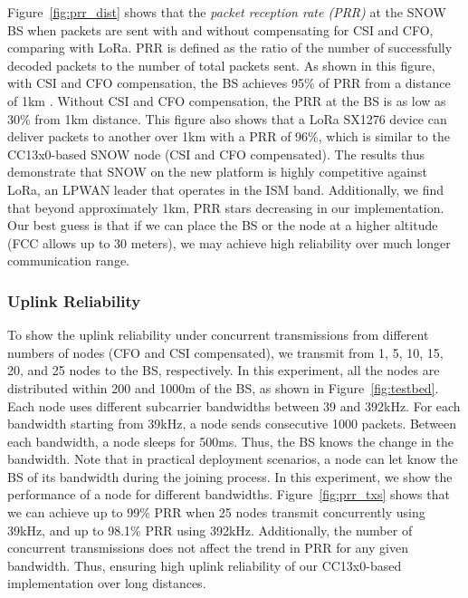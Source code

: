Figure~\ref{fig:prr_dist} shows that the {\em packet reception rate (PRR)} at the SNOW BS when packets are sent with and without compensating for CSI and CFO, comparing with LoRa. PRR is defined as the ratio of the number of successfully decoded packets to the number of total packets sent.
As shown in this figure, with CSI and CFO compensation, the BS achieves 95\% of PRR from a distance of 1km . 
Without CSI and CFO compensation, the PRR at the BS is as low as 30\% from 1km distance. This figure also shows that a LoRa SX1276 device can deliver packets to another over 1km with a PRR of 96\%, which is similar to the CC13x0-based SNOW node (CSI and CFO compensated). The results thus demonstrate that SNOW on the new platform is highly competitive against LoRa, an LPWAN leader that operates in the ISM band. Additionally,
we find that beyond approximately 1km, PRR stars decreasing in our implementation. Our best guess is that if we can place the BS or the node at a higher altitude (FCC allows up to 30 meters), we may achieve high reliability over much longer communication range.

\subsubsection{Uplink Reliability}
To show the uplink reliability under concurrent transmissions from different numbers of nodes (CFO and CSI compensated), we transmit from 1, 5, 10, 15, 20, and 25 nodes to the BS, respectively. In this experiment, all the nodes are distributed within 200 and 1000m of the BS, as shown in Figure~\ref{fig:testbed}. Each node uses different subcarrier bandwidths between 39 and 392kHz. For each bandwidth starting from 39kHz, a node sends consecutive 1000 packets. Between each bandwidth, a node sleeps for 500ms. Thus, the BS knows the change in the bandwidth. 
Note that in practical deployment scenarios, a node can let know the BS of its bandwidth during the joining process.
In this experiment, we show the performance of a node for different bandwidths. Figure~\ref{fig:prr_txs} shows that we can achieve up to 99\% PRR when 25 nodes transmit concurrently using 39kHz, and up to 98.1\% PRR using 392kHz. Additionally, the number of concurrent transmissions does not affect the trend in PRR for any given bandwidth.
Thus, ensuring high uplink reliability of our CC13x0-based implementation over long distances.

